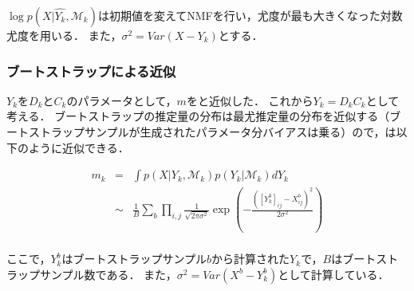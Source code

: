 $\log p(X | \hat{Y_k}, \mathcal{M}_k)$は初期値を変えてNMFを行い，尤度が最も大きくなった対数尤度を用いる．
また，$\sigma^2 = Var(X - Y_k)$とする．

\subsubsection{ブートストラップによる近似}
$Y_k$を$D_k$と$C_k$のパラメータとして，$m$をと近似した．
これから$Y_k = D_kC_k$として考える．
ブートストラップの推定量の分布は最尤推定量の分布を近似する（ブートストラップサンプルが生成されたパラメータ分バイアスは乗る）ので，は以下のように近似できる．

\begin{eqnarray}
	m_k &=& \int p(X | Y_k, \mathcal{M}_k) p(Y_k| \mathcal{M}_k) dY_k \\
	&\sim& \frac{1}{B} \sum_b \prod_{i,j} \frac{1}{\sqrt{2 \pi \sigma^2}} \exp\left(-\frac{([Y_k^b]_{ij} - X^b_{ij})^2}{2 \sigma^2} \right) \\
	\label{eq:simm2}
\end{eqnarray}

ここで，$Y_k^b$はブートストラップサンプル$b$から計算された$Y_k$で，$B$はブートストラップサンプル数である．
また，$\sigma^2 = Var(X^b - Y^b_k)$として計算している．
